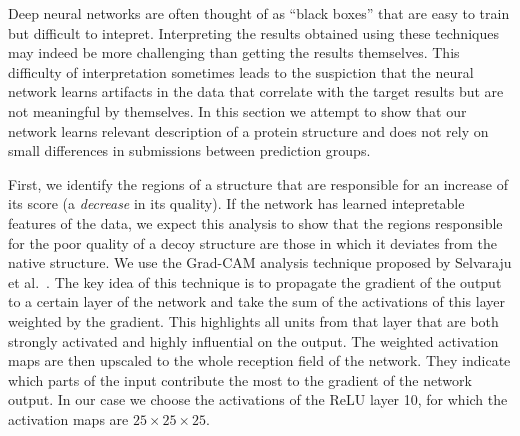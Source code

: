 Deep neural networks are often thought of as ``black boxes'' that are
easy to train but difficult to intepret. Interpreting the results
obtained using these techniques may indeed be more challenging than
getting the results themselves. This difficulty of interpretation
sometimes leads to the suspiction that the neural network learns
artifacts in the data that correlate with the target results but are
not meaningful by themselves.
%
In this section we attempt to show that our network learns relevant
description of a protein structure and does not rely on small
differences in submissions between prediction groups.

First, we identify the regions of a structure that are responsible for
an increase of its score (a \emph{decrease} in its quality). If the
network has learned intepretable features of the data, we expect this
analysis to show that the regions responsible for the poor quality of
a decoy structure are those in which it deviates from the native
structure.
%
We use the Grad-CAM analysis technique proposed by Selvaraju et
al.~\cite{selvaraju2016grad}. The key idea of this technique is to
propagate the gradient of the output to a certain layer of the network
and take the sum of the activations of this layer weighted by the
gradient.
%
%
%
This highlights all units from that layer that are both strongly
activated and highly influential on the output.
%
The weighted activation maps are then upscaled to the whole
reception field of the network. They indicate which parts of the
input contribute the most to the gradient of the network output.
%
In our case we choose the activations of the ReLU layer 10, for which
the activation maps are $25\times 25\times 25$.
%
